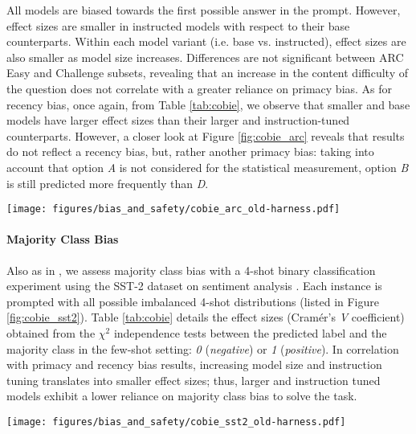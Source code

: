 All models are biased towards the first possible answer in the prompt. However, effect sizes are smaller in instructed models with respect to their base counterparts. Within each model variant (i.e. base vs. instructed), effect sizes are also smaller as model size increases. Differences are not significant between ARC Easy and Challenge subsets, revealing that an increase in the content difficulty of the question does not correlate with a greater reliance on primacy bias. As for recency bias, once again, from Table \ref{tab:cobie}, we observe that smaller and base models have larger effect sizes than their larger and instruction-tuned counterparts. However, a closer look at Figure \ref{fig:cobie_arc} reveals that results do not reflect a recency bias, but, rather another primacy bias: taking into account that option \textit{A} is not considered for the statistical measurement, option \textit{B} is still predicted more frequently than \textit{D}. 

\begin{figure*}[htb!]
    \centering
    \texttt{[image: figures/bias\_and\_safety/cobie\_arc\_old-harness.pdf]}
    \caption{Frequency distributions of predicted answers on ARC Easy and Challenge subsets depending on their position in the prompt.}
    \label{fig:cobie_arc}
\end{figure*}

\paragraph{Majority Class Bias} Also as in \cite{cobie}, we assess majority class bias with a 4-shot binary classification experiment using the SST-2 dataset on sentiment analysis \citep{socher-etal-2013-recursive}. Each instance is prompted with all possible imbalanced 4-shot distributions (listed in Figure \ref{fig:cobie_sst2}). Table \ref{tab:cobie} details the effect sizes (Cramér's \textit{V} coefficient) obtained from the $\chi^2$ independence tests between the predicted label and the majority class in the few-shot setting: \textit{0} (\textit{negative}) or \textit{1} (\textit{positive}). In correlation with primacy and recency bias results,  increasing model size and instruction tuning translates into smaller effect sizes; thus, larger and instruction tuned models exhibit a lower reliance on majority class bias to solve the task.

\begin{figure*}[htb!]
    \centering
    \texttt{[image: figures/bias\_and\_safety/cobie\_sst2\_old-harness.pdf]}
    \caption{Frequency distributions of class \textit{0} predictions on SST-2 dataset depending on the class distribution in
few-shot. \textit{0} denotes the negative class, while \textit{1} denotes the positive class.}
    \label{fig:cobie_sst2}
\end{figure*}

